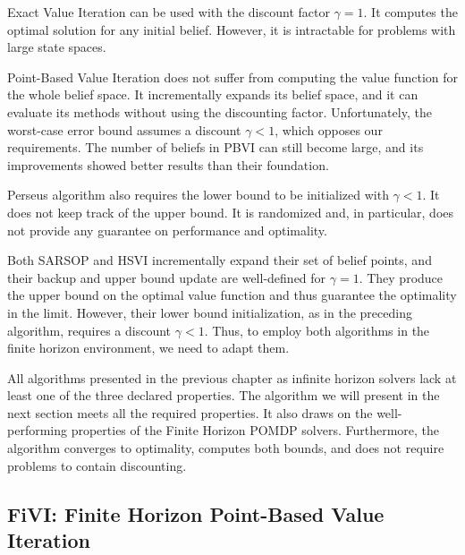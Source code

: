Exact Value Iteration can be used with the discount factor $\gamma = 1$. It computes the optimal solution for any initial belief. However, it is intractable for problems with large state spaces.

Point-Based Value Iteration does not suffer from computing the value function for the whole belief space. It incrementally expands its belief space, and it can evaluate its methods without using the discounting factor. Unfortunately, the worst-case error bound assumes a discount $\gamma < 1$, which opposes our requirements. The number of beliefs in PBVI  can still become large, and its improvements showed better results than their foundation.

Perseus algorithm also requires the lower bound to be initialized with $\gamma < 1$. It does not keep track of the upper bound. It is randomized and, in particular, does not provide any guarantee on performance and optimality.

Both SARSOP and HSVI incrementally expand their set of belief points, and their backup and upper bound update are well-defined for $\gamma = 1$. They produce the upper bound on the optimal value function and thus guarantee the optimality in the limit. However, their lower bound initialization, as in the preceding algorithm, requires a discount $\gamma < 1$. Thus, to employ both algorithms in the finite horizon environment, we need to adapt them.

All algorithms presented in the previous chapter as infinite horizon solvers lack at least one of the three declared properties. The algorithm we will present in the next section meets all the required properties. It also draws on the well-performing properties of the Finite Horizon POMDP solvers. Furthermore, the algorithm converges to optimality, computes both bounds, and does not require problems to contain discounting.

\subsection{FiVI: Finite Horizon Point-Based Value Iteration}





\newpage

